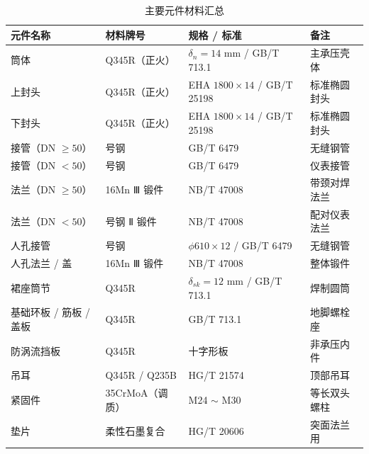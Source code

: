 \begin{table}[!htb]
  \centering
  \caption{主要元件材料汇总}
  \label{tab:material-summary}
  \small\renewcommand{\arraystretch}{1.15}
  \setlength{\tabcolsep}{8pt}
  \begin{tabularx}{\textwidth}{@{}l>{\centering\arraybackslash}X>{\centering\arraybackslash}X>{\centering\arraybackslash}X@{}}
    \toprule
    \textbf{元件名称} & \textbf{材料牌号} & \textbf{规格 / 标准} & \textbf{备注} \\
    \midrule
    筒体                   & Q345R（正火）& $\delta_n = 14$ mm / GB/T 713.1 & 主承压壳体 \\
    上封头                 & Q345R（正火）& EHA $1800 \times 14$ / GB/T 25198 & 标准椭圆封头 \\
    下封头                 & Q345R（正火）& EHA $1800 \times 14$ / GB/T 25198 & 标准椭圆封头 \\
    接管（DN $\ge 50$）     & 20 号钢       & GB/T 6479                      & 无缝钢管 \\
    接管（DN $< 50$）       & 20 号钢       & GB/T 6479                      & 仪表接管 \\
    法兰（DN $\ge 50$）     & 16Mn Ⅲ 锻件  & NB/T 47008                     & 带颈对焊法兰 \\
    法兰（DN $< 50$）       & 20 号钢 Ⅱ 锻件& NB/T 47008                     & 配对仪表法兰 \\
    人孔接管               & 20 号钢       & $\phi 610 \times 12$ / GB/T 6479 & 无缝钢管 \\
    人孔法兰 / 盖          & 16Mn Ⅲ 锻件  & NB/T 47008                     & 整体锻件 \\
    裙座筒节               & Q345R         & $\delta_{sk} = 12$ mm / GB/T 713.1 & 焊制圆筒 \\
    基础环板 / 筋板 / 盖板 & Q345R         & GB/T 713.1                     & 地脚螺栓座 \\
    防涡流挡板             & Q345R         & 十字形板                       & 非承压内件 \\
    吊耳                   & Q345R / Q235B & HG/T 21574                     & 顶部吊耳 \\
    紧固件                 & 35CrMoA（调质）& M24 $\sim$ M30                 & 等长双头螺柱 \\
    垫片                   & 柔性石墨复合  & HG/T 20606                     & 突面法兰用 \\
    \bottomrule
  \end{tabularx}
\end{table}

